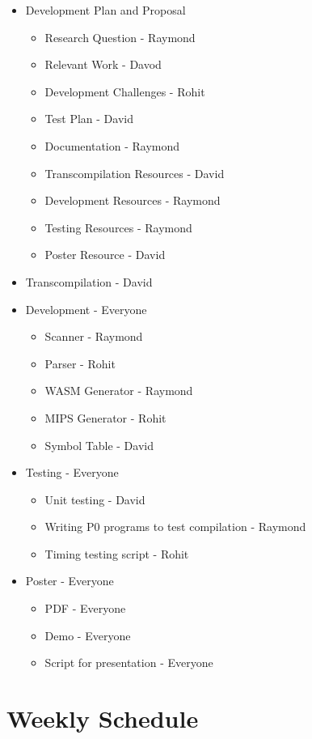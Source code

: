 \documentclass{article}
\begin{document}
\begin{itemize}
  \item Development Plan and Proposal
  \begin{itemize}
    \item Research Question - Raymond
    \item Relevant Work - Davod
    \item Development Challenges - Rohit
    \item Test Plan - David
    \item Documentation - Raymond
    \item Transcompilation Resources - David
    \item Development Resources - Raymond
    \item Testing Resources - Raymond
    \item Poster Resource - David
  \end{itemize}
  \item Transcompilation - David
  \item Development - Everyone
  \begin{itemize}
    \item Scanner - Raymond
    \item Parser - Rohit
    \item WASM Generator - Raymond
    \item MIPS Generator - Rohit
    \item Symbol Table - David
  \end{itemize}
  \item Testing - Everyone
  \begin{itemize}
    \item Unit testing - David
    \item Writing P0 programs to test compilation - Raymond
    \item Timing testing script - Rohit
  \end{itemize}
  \item Poster - Everyone
  \begin{itemize}
    \item PDF - Everyone
    \item Demo - Everyone
    \item Script for presentation - Everyone
  \end{itemize}
\end{itemize}

\section{Weekly Schedule} %
\end{document}
